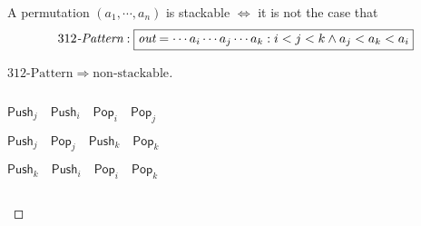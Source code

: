 \begin{frame}{}
  \begin{theorem}
    A permutation $(a_1, \cdots, a_n)$ is stackable $\iff$ it is not the case that
    \[
      312\text{\it -Pattern}: \fbox{$\texttt{\it out} = \cdots a_i \cdots a_j \cdots a_k: i < j < k \land a_j < a_k < a_i$}
    \]
  \end{theorem}

  \vspace{0.30cm}
  \begin{proof}[$312\text{-Pattern} \Longrightarrow \text{non-stackable}$]
    \begin{columns}
        \pause
	\begin{description}[$j < k \land a_j < a_k$:]
	  \item[$i < j \land a_j < a_i$:] $\textsf{Push}_{j} \quad \textsf{Push}_{i} \quad \textsf{Pop}_{i} \quad \textsf{Pop}_{j}$
	  \item[$j < k \land a_j < a_k$:] $\textsf{Push}_{j} \quad \textsf{Pop}_{j} \quad \textsf{Push}_{k} \quad \textsf{Pop}_{k}$
	  \item[$i < k \land a_k < a_i$:] $\textsf{Push}_{k} \quad \textsf{Push}_{i} \quad \textsf{Pop}_{i} \quad \textsf{Pop}_{k}$
	\end{description}
    \end{columns}
  \end{proof}
\end{frame}

